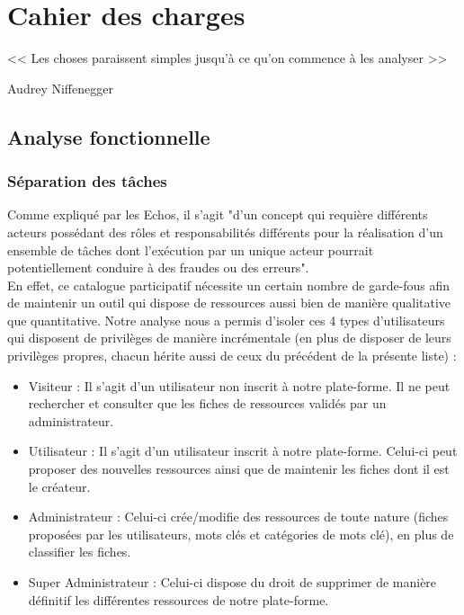 \chapter{Cahier des charges}

\epigraph{<< Les choses paraissent simples jusqu'à ce qu'on commence à les analyser >>}{Audrey Niffenegger}

\section{Analyse fonctionnelle}

\subsection*{Séparation des tâches}

Comme expliqué par les Echos\cite{SOD}, il s'agit  "d'un concept qui requière différents acteurs possédant des rôles et responsabilités différents pour la réalisation d’un ensemble de tâches dont l’exécution par un unique acteur pourrait potentiellement conduire à des fraudes ou des erreurs". \\


En effet, ce catalogue participatif nécessite un certain nombre de garde-fous afin de maintenir un outil qui dispose de ressources aussi bien de manière qualitative que quantitative. Notre analyse nous a permis d'isoler ces 4 types d'utilisateurs qui disposent de privilèges de manière incrémentale (en plus de disposer de leurs privilèges propres, chacun hérite aussi de ceux du précédent de la présente liste) :

\begin{itemize}
    \item Visiteur : Il s'agit d'un utilisateur non inscrit à notre plate-forme. Il ne peut rechercher et consulter que les fiches de ressources validés par un administrateur.
    \item Utilisateur : Il s'agit d'un utilisateur  inscrit à notre plate-forme. Celui-ci peut proposer des nouvelles ressources ainsi que de maintenir les fiches dont il est le créateur.
    \item Administrateur : Celui-ci crée/modifie des ressources de toute nature (fiches proposées par les utilisateurs, mots clés et catégories de mots clé), en plus de classifier les fiches.
    \item Super Administrateur : Celui-ci dispose du droit de supprimer de manière définitif les différentes ressources de notre plate-forme.
\end{itemize}

